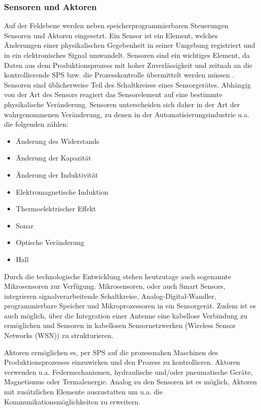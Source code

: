 \subsubsection{Sensoren und Aktoren}
Auf der Feldebene werden neben speicherprogrammierbaren Steuerungen Sensoren und Aktoren eingesetzt. 
Ein Sensor ist ein Element, welches Änderungen einer physikalischen Gegebenheit in seiner Umgebung registriert und in ein elektronisches Signal umwandelt. Sensoren sind ein wichtiges Element, da Daten aus dem Produktionsprozess mit hoher Zuverlässigkeit und zeitnah an die kontrollierende SPS bzw. die Prozesskontrolle übermittelt werden müssen \citep{Jeong2009}. Sensoren sind üblicherweise Teil des Schaltkreises eines Sensorgerätes. Abhängig von der Art des Sensors reagiert das Sensorelement auf eine bestimmte physikalische Veränderung. Sensoren unterscheiden sich daher in der Art der wahrgenommenen  Veränderung, zu denen in der Automatisierungsindustrie u.a. die folgenden zählen:
\begin{itemize}
\item Änderung des Widerstands
\item Änderung der Kapazität
\item Änderung der Induktivität
\item Elektromagnetische Induktion
\item Thermoelektrischer Effekt
\item Sonar
\item Optische Veränderung
\item Hall
\end{itemize}

Durch die technologische Entwicklung stehen heutzutage auch sogenannte Mikrosensoren zur Verfügung. Mikrosensoren, oder auch \glqq Smart Sensors\grqq , integrieren signalverarbeitende Schaltkreise, Analog-Digital-Wandler, programmierbare Speicher und Mikroprozessoren in ein Sensorgerät. Zudem ist es auch möglich, über die Integration einer Antenne eine kabellose Verbindung zu ermöglichen und Sensoren in kabellosen Sensornetzwerken (Wireless Sensor Networks (WSN)) zu strukturieren\citep{Jeong2009}.

Aktoren ermöglichen es, per SPS auf die prozessnahen Maschinen des Produktionsprozesses einzuwirken und den Prozess zu kontrollieren. Aktoren verwenden u.a. Federmechanismen, hydraulische und/oder pneumatische Geräte, Magnetismus oder Termalenergie. Analog zu den Sensoren ist es möglich, Aktoren mit zusätzlichen Elemente auszustatten um u.a. die Kommunikationsmöglichkeiten zu erweitern\citep{Jeong2009}.

